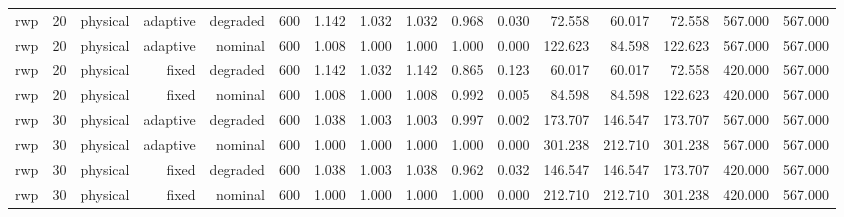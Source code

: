 \begin{tabular}{lrrrrrrrrrrrrrrr}
rwp & 20 & physical & adaptive & degraded & 600 & 1.142 & 1.032 & 1.032 & 0.968 & 0.030 & 72.558 & 60.017 & 72.558 & 567.000 & 567.000 \\
rwp & 20 & physical & adaptive & nominal & 600 & 1.008 & 1.000 & 1.000 & 1.000 & 0.000 & 122.623 & 84.598 & 122.623 & 567.000 & 567.000 \\
rwp & 20 & physical & fixed & degraded & 600 & 1.142 & 1.032 & 1.142 & 0.865 & 0.123 & 60.017 & 60.017 & 72.558 & 420.000 & 567.000 \\
rwp & 20 & physical & fixed & nominal & 600 & 1.008 & 1.000 & 1.008 & 0.992 & 0.005 & 84.598 & 84.598 & 122.623 & 420.000 & 567.000 \\
rwp & 30 & physical & adaptive & degraded & 600 & 1.038 & 1.003 & 1.003 & 0.997 & 0.002 & 173.707 & 146.547 & 173.707 & 567.000 & 567.000 \\
rwp & 30 & physical & adaptive & nominal & 600 & 1.000 & 1.000 & 1.000 & 1.000 & 0.000 & 301.238 & 212.710 & 301.238 & 567.000 & 567.000 \\
rwp & 30 & physical & fixed & degraded & 600 & 1.038 & 1.003 & 1.038 & 0.962 & 0.032 & 146.547 & 146.547 & 173.707 & 420.000 & 567.000 \\
rwp & 30 & physical & fixed & nominal & 600 & 1.000 & 1.000 & 1.000 & 1.000 & 0.000 & 212.710 & 212.710 & 301.238 & 420.000 & 567.000 \\
\bottomrule
\end{tabular}